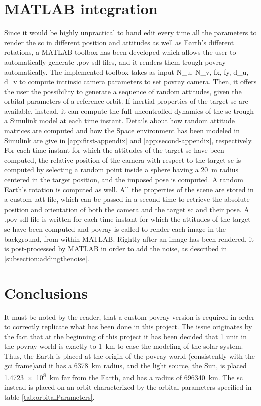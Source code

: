 \section{MATLAB integration}
Since it would be highly unpractical to hand edit every time all the parameters to render the \acrshort{sc} in different position and attitudes as well as Earth's different rotations, a MATLAB toolbox has been developed which allows the user to automatically generate .pov \acrshort{sdl} files, and it renders them trough \acrshort{povray} automatically.
The implemented toolbox takes as input \gls{N_u}, \gls{N_v}, \gls{fx}, \gls{fy}, \gls{d_u}, \gls{d_v} to compute intrinsic camera parameters to set \acrshort{povray} camera.
Then, it offers the user the possibility to generate a sequence of random attitudes, given the orbital parameters of a reference orbit. If inertial properties of the target \acrshort{sc} are available, instead, it can compute the full uncontrolled dynamics of the \acrshort{sc} trough a Simulink model at each time instant. Details about how random attitude matrices are computed and how the Space environment has been modeled in Simulink are give in \ref{app:first-appendix} and \ref{app:second-appendix}, respectively.
For each time instant for which the attitudes of the target \acrshort{sc} have been computed, the relative position of the camera with respect to the target \acrshort{sc} is computed by selecting a random point inside a sphere having a \SI{20}{\m} radius centered in the target position, and the imposed pose is computed. A random Earth's rotation is computed as well.
All the properties of the scene are stored in a custom .att file, which can be passed in a second time to retrieve the absolute position and orientation of both the camera and the target \acrshort{sc} and their pose.
A .pov \acrshort{sdl} file is written for each time instant for which the attitudes of the target \acrshort{sc} have been computed and \acrshort{povray} is called to render each image in the background, from within MATLAB. Rightly after an image has been rendered, it is post-processed by MATLAB in order to add the noise, as described in \ref{subsection:addingthenoise}.

\section{Conclusions}
It must be noted by the reader, that a custom \acrshort{povray} version is required in order to correctly replicate what has been done in this project.
The issue originates by the fact that at the beginning of this project it has been decided that 1 unit in the \acrshort{povray} world is exactly to \SI{1}{\km} to ease the modeling of the solar system. Thus, the Earth is placed at the origin of the \acrshort{povray} world (consistently with the \acrshort{gci} frame)and it has a \SI{6378}{\km} radius, and the light source, the Sun, is placed \SI{1.4723e8}{\km} far from the Earth, and has a radius of \SI{696340}{\km}.
The \acrshort{sc} instead is placed on an orbit characterized by the orbital parameters specified in table \ref{tab:orbitalParameters}.

